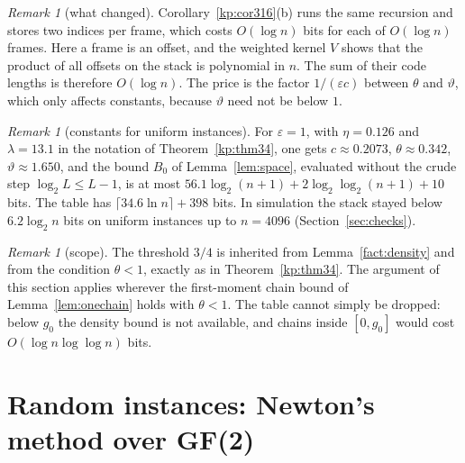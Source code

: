 \documentclass[11pt]{amsart}
\theoremstyle{definition}
\theoremstyle{remark}
\newtheorem{remark}[theorem]{Remark}
\newcommand{\eps}{\varepsilon}
\begin{document}
\begin{remark}[what changed]
Corollary~\ref{kp:cor316}(b) runs the same recursion and stores two indices per frame, which costs
$O(\log n)$ bits for each of $O(\log n)$ frames. Here a frame is an offset, and the weighted
kernel $V$ shows that the product of all offsets on the stack is polynomial in $n$. The sum of
their code lengths is therefore $O(\log n)$. The price is the factor $1/(\eps c)$ between
$\theta$ and $\vartheta$, which only affects constants, because $\vartheta$ need not be below $1$.
\end{remark}

\begin{remark}[constants for uniform instances]\label{rem:constants}
For $\eps=1$, with $\eta=0.126$ and $\lambda=13.1$ in the notation of Theorem~\ref{kp:thm34}, one
gets $c\approx0.2073$, $\theta\approx0.342$, $\vartheta\approx1.650$, and the bound $B_0$ of
Lemma~\ref{lem:space}, evaluated without the crude step $\log_2L\le L-1$, is at most
$56.1\log_2(n+1)+2\log_2\log_2(n+1)+10$ bits. The table has
$\lceil34.6\ln n\rceil+398$ bits. In simulation the stack stayed below $6.2\log_2n$ bits on uniform
instances up to $n=4096$ (Section~\ref{sec:checks}).
\end{remark}

\begin{remark}[scope]
The threshold $3/4$ is inherited from Lemma~\ref{fact:density} and from the condition
$\theta<1$, exactly as in Theorem~\ref{kp:thm34}. The argument of this section applies wherever the first-moment
chain bound of Lemma~\ref{lem:onechain} holds with $\theta<1$. The table cannot simply be
dropped: below $g_0$ the density bound is not available, and chains inside $[0,g_0]$ would cost
$O(\log n\log\log n)$ bits.
\end{remark}


\section{Random instances: Newton's method over GF(2)}\label{sec:newton}

\providecommand{\nwone}{\mathbf{1}}
\providecommand{\nwcl}{\mathrm{cl}}
\providecommand{\nwGF}{\mathrm{GF}(2)}
\providecommand{\nwsucc}{\mathrm{succ}}
\end{document}

